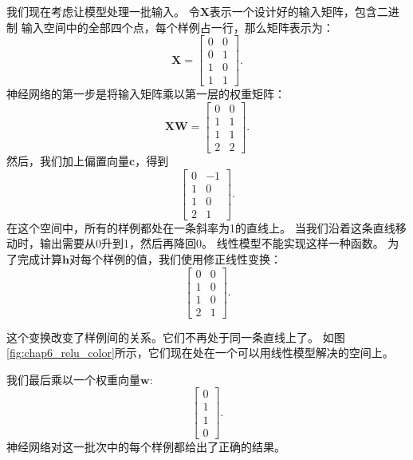 我们现在考虑让模型处理一批输入。
令$\bm{X}$表示一个设计好的输入矩阵，包含二进制 输入空间中的全部四个点，每个样例占一行，那么矩阵表示为：
\begin{equation} 
\bm{X} = \begin{bmatrix}
0 & 0\\
0 & 1\\ 
1 & 0\\ 
1 & 1
\end{bmatrix}. 
\end{equation} 
神经网络的第一步是将输入矩阵乘以第一层的权重矩阵： \begin{equation}
\bm{X}\bm{W} = \begin{bmatrix} 
0 & 0\\ 
1 & 1\\ 
1 & 1\\ 
2 & 2 
\end{bmatrix}.
\end{equation} 
然后，我们加上偏置向量$\bm{c}$，得到 
\begin{equation} 
\begin{bmatrix} 
0 & -1\\
1 & 0\\ 
1 & 0\\ 
2 & 1 
\end{bmatrix}. 
\end{equation}
在这个空间中，所有的样例都处在一条斜率为1的直线上。
当我们沿着这条直线移动时，输出需要从0升到1，然后再降回0。
线性模型不能实现这样一种函数。
为了完成计算$\bm{h}$对每个样例的值，我们使用修正线性变换： 
\begin{equation}
\begin{bmatrix} 
0 & 0\\ 
1 & 0\\ 
1 & 0\\ 
2 & 1 
\end{bmatrix}. 
\end{equation}


这个变换改变了样例间的关系。它们不再处于同一条直线上了。
如图\ref{fig:chap6_relu_color}所示，它们现在处在一个可以用线性模型解决的空间上。

我们最后乘以一个权重向量$\bm{w}$:
\begin{equation}
\begin{bmatrix}
0\\
1\\
1\\
0
\end{bmatrix}.
\end{equation}
神经网络对这一批次中的每个样例都给出了正确的结果。

